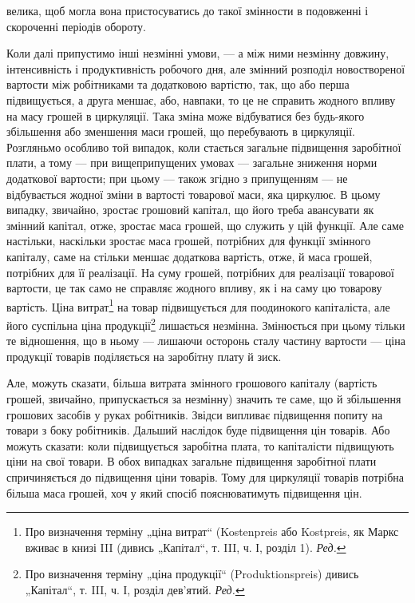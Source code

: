 \parcont{}  %
велика, щоб могла вона пристосуватись до такої змінности в подовженні
і скороченні періодів обороту.

Коли далі припустимо інші незмінні умови, — а між ними незмінну
довжину, інтенсивність і продуктивність робочого дня, але змінний
розподіл новоствореної вартости між робітниками та додатковою
вартістю, так, що або перша підвищується, а друга меншає,
або, навпаки, то це не справить жодного впливу на масу грошей в
циркуляції. Така зміна може відбуватися без будь-якого збільшення або
зменшення маси грошей, що перебувають в циркуляції. Розгляньмо особливо
той випадок, коли стається загальне підвищення заробітної плати,
а тому — при вищеприпущених умовах — загальне зниження норми додаткової
вартости; при цьому — також згідно з припущенням — не відбувається
жодної зміни в вартості товарової маси, яка циркулює. В цьому
випадку, звичайно, зростає грошовий капітал, що його треба авансувати
як змінний капітал, отже, зростає маса грошей, що служить у цій
функції. Але саме настільки, наскільки зростає маса грошей, потрібних
для функції змінного капіталу, саме на стільки меншає додаткова вартість,
отже, й маса грошей, потрібних для її реалізації. На суму грошей,
потрібних для реалізації товарової вартости, це так само не справляє
жодного впливу, як і на саму цю товарову вартість. Ціна витрат\footnote*{
Про визначення терміну „ціна витрат“ (Kostenpreis або Kostpreis, як Маркс
вживає в книзі III (дивись „Капітал“, т. III, ч. І, розділ 1). \emph{Ред.}
} на
товар підвищується для поодинокого капіталіста, але його суспільна ціна
продукції\footnote*{
Про визначення терміну „ціна продукції“ (Produktionspreis) дивись „Капітал“,
т. III, ч. І, розділ дев’ятий. \emph{Ред.}
} лишається незмінна. Змінюється при цьому тільки те відношення,
що в ньому — лишаючи осторонь сталу частину вартости — ціна
продукції товарів поділяється на заробітну плату й зиск.

Але, можуть сказати, більша витрата змінного грошового капіталу
(вартість грошей, звичайно, припускається за незмінну) значить те саме,
що й збільшення грошових засобів у руках робітників. Звідси випливає
підвищення попиту на товари з боку робітників. Дальший наслідок буде
підвищення цін товарів. Або можуть сказати: коли підвищується заробітна
плата, то капіталісти підвищують ціни на свої товари. В обох випадках
загальне підвищення заробітної плати спричиняється до підвищення ціни
товарів. Тому для циркуляції товарів потрібна більша маса грошей, хоч
у який спосіб пояснюватимуть підвищення цін.

